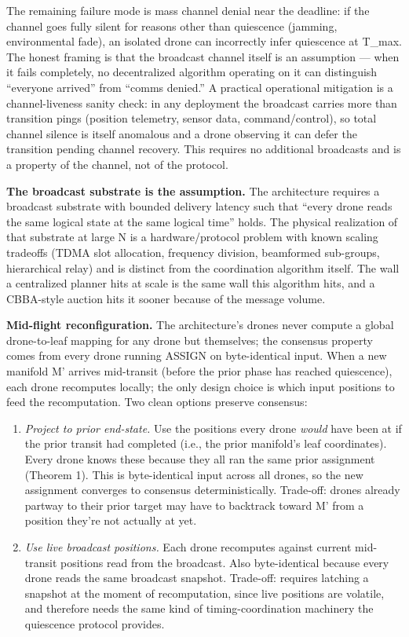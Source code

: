 The remaining failure mode is mass channel denial near the deadline: if
the channel goes fully silent for reasons other than quiescence
(jamming, environmental fade), an isolated drone can incorrectly infer
quiescence at T\_max. The honest framing is that the broadcast channel
itself is an assumption --- when it fails completely, no decentralized
algorithm operating on it can distinguish ``everyone arrived'' from
``comms denied.'' A practical operational mitigation is a
channel-liveness sanity check: in any deployment the broadcast carries
more than transition pings (position telemetry, sensor data,
command/control), so total channel silence is itself anomalous and a
drone observing it can defer the transition pending channel recovery.
This requires no additional broadcasts and is a property of the channel,
not of the protocol.

\textbf{The broadcast substrate is the assumption.} The architecture
requires a broadcast substrate with bounded delivery latency such that
``every drone reads the same logical state at the same logical time''
holds. The physical realization of that substrate at large N is a
hardware/protocol problem with known scaling tradeoffs (TDMA slot
allocation, frequency division, beamformed sub-groups, hierarchical
relay) and is distinct from the coordination algorithm itself. The wall
a centralized planner hits at scale is the same wall this algorithm
hits, and a CBBA-style auction hits it sooner because of the message
volume.

\textbf{Mid-flight reconfiguration.} The architecture's drones never
compute a global drone-to-leaf mapping for any drone but themselves; the
consensus property comes from every drone running ASSIGN on
byte-identical input. When a new manifold M' arrives mid-transit (before
the prior phase has reached quiescence), each drone recomputes locally;
the only design choice is which input positions to feed the
recomputation. Two clean options preserve consensus:

\begin{enumerate}
\def\labelenumi{\arabic{enumi}.}
\tightlist
\item
  \emph{Project to prior end-state.} Use the positions every drone
  \emph{would} have been at if the prior transit had completed (i.e.,
  the prior manifold's leaf coordinates). Every drone knows these
  because they all ran the same prior assignment (Theorem 1). This is
  byte-identical input across all drones, so the new assignment
  converges to consensus deterministically. Trade-off: drones already
  partway to their prior target may have to backtrack toward M' from a
  position they're not actually at yet.
\item
  \emph{Use live broadcast positions.} Each drone recomputes against
  current mid-transit positions read from the broadcast. Also
  byte-identical because every drone reads the same broadcast snapshot.
  Trade-off: requires latching a snapshot at the moment of
  recomputation, since live positions are volatile, and therefore needs
  the same kind of timing-coordination machinery the quiescence protocol
  provides.
\end{enumerate}

